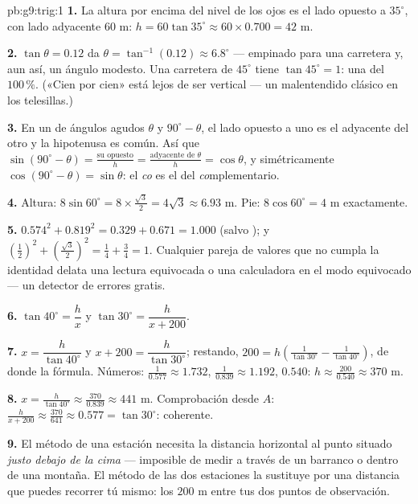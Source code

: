 \begin{solution}{pb:g9:trig:1}
\textbf{1.} La altura por encima del nivel de los ojos es el lado opuesto a
$35^\circ$, con lado adyacente $60$ m:
$h = 60 \tan 35^\circ \approx 60 \times 0.700 = 42$ m.

\textbf{2.} $\tan\theta = 0.12$ da
$\theta = \tan^{-1}(0.12) \approx 6.8^\circ$ --- empinado para una
carretera y, aun así, un ángulo modesto. Una carretera de $45^\circ$ tiene
$\tan 45^\circ = 1$: una  del $100\,\%$. («Cien
por cien» está lejos de ser vertical --- un malentendido clásico
en los telesillas.)

\textbf{3.} En un  de ángulos agudos $\theta$ y
$90^\circ - \theta$, el lado opuesto a uno es el adyacente del
otro y la hipotenusa es común. Así que
$\sin(90^\circ - \theta) = \frac{\text{su opuesto}}{h} =
\frac{\text{adyacente de }\theta}{h} = \cos\theta$, y
simétricamente $\cos(90^\circ - \theta) = \sin\theta$: el
\emph{co} es el  del \emph{co}mplementario.

\textbf{4.} Altura: $8 \sin 60^\circ = 8 \times
\frac{\sqrt3}{2} = 4\sqrt3 \approx 6.93$ m. Pie:
$8 \cos 60^\circ = 4$ m exactamente.

\textbf{5.} $0.574^2 + 0.819^2 = 0.329 + 0.671 = 1.000$ (salvo
); y $\left(\frac12\right)^2 +
\left(\frac{\sqrt3}{2}\right)^2 = \frac14 + \frac34 = 1$. Cualquier
pareja de valores que no cumpla la identidad delata una lectura equivocada o
una calculadora en el modo equivocado --- un detector de errores gratis.

\textbf{6.} $\tan 40^\circ = \dfrac hx$ y
$\tan 30^\circ = \dfrac{h}{x + 200}$.

\textbf{7.} $x = \dfrac{h}{\tan 40^\circ}$ y
$x + 200 = \dfrac{h}{\tan 30^\circ}$; restando,
$200 = h\left(\frac{1}{\tan 30^\circ} -
\frac{1}{\tan 40^\circ}\right)$, de donde la fórmula. Números:
$\frac{1}{0.577} \approx 1.732$, $\frac{1}{0.839} \approx
1.192$,  $0.540$:
$h \approx \frac{200}{0.540} \approx 370$ m.

\textbf{8.} $x = \frac{h}{\tan 40^\circ} \approx
\frac{370}{0.839} \approx 441$ m. Comprobación desde $A$:
$\frac{h}{x + 200} \approx \frac{370}{641} \approx 0.577 =
\tan 30^\circ$: coherente.

\textbf{9.} El método de una estación necesita la distancia horizontal
al punto situado \emph{justo debajo de la cima} ---
imposible de medir a través de un barranco o dentro de una montaña. El
método de las dos estaciones la sustituye por una distancia que puedes recorrer
tú mismo: los $200$ m entre tus dos puntos de observación.


\end{solution}
